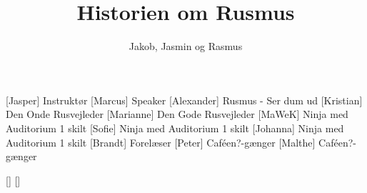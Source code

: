 \documentclass[a4paper,11pt]{article}
\title{Historien om Rusmus}
\author{Jakob, Jasmin og Rasmus}
\begin{document}
\maketitle

\begin{roles}
[Jasper] Instruktør
[Marcus] Speaker
[Alexander] Rusmus - Ser dum ud
[Kristian] Den Onde Rusvejleder
[Marianne] Den Gode Rusvejleder
[MaWeK] Ninja med Auditorium 1 skilt
[Sofie] Ninja med Auditorium 1 skilt
[Johanna] Ninja med Auditorium 1 skilt
[Brandt] Forelæser
[Peter] Caféen?-gænger
[Malthe] Caféen?-gænger
\end{roles}

\begin{props}
[]
[]
\end{props}
  
\end{document}
